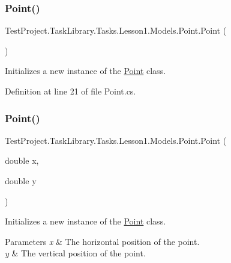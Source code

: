 \subsubsection{\texorpdfstring{Point()}{Point()}\hspace{0.1cm}{\footnotesize\ttfamily [1/2]}}
{\footnotesize\ttfamily Test\+Project.\+Task\+Library.\+Tasks.\+Lesson1.\+Models.\+Point.\+Point (\begin{DoxyParamCaption}{ }\end{DoxyParamCaption})}



Initializes a new instance of the \mbox{\hyperlink{class_test_project_1_1_task_library_1_1_tasks_1_1_lesson1_1_1_models_1_1_point}{Point}} class. 



Definition at line 21 of file Point.\+cs.

\mbox{\label{class_test_project_1_1_task_library_1_1_tasks_1_1_lesson1_1_1_models_1_1_point_a8aeff5ba15b460f78248355f699b3b84}} 
\subsubsection{\texorpdfstring{Point()}{Point()}\hspace{0.1cm}{\footnotesize\ttfamily [2/2]}}
{\footnotesize\ttfamily Test\+Project.\+Task\+Library.\+Tasks.\+Lesson1.\+Models.\+Point.\+Point (\begin{DoxyParamCaption}\item[{double}]{x,  }\item[{double}]{y }\end{DoxyParamCaption})}



Initializes a new instance of the \mbox{\hyperlink{class_test_project_1_1_task_library_1_1_tasks_1_1_lesson1_1_1_models_1_1_point}{Point}} class. 


\begin{DoxyParams}{Parameters}
{\em x} & The horizontal position of the point.\\
\hline
{\em y} & The vertical position of the point.\\
\hline
\end{DoxyParams}


